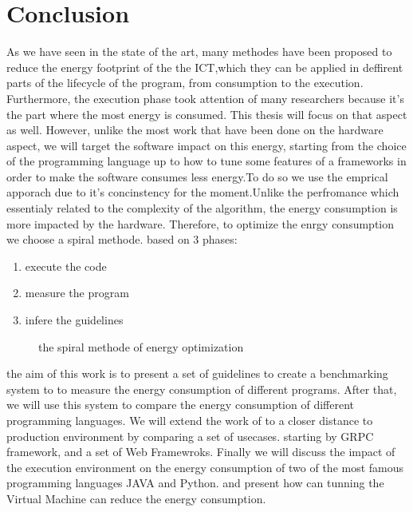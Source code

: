 \section{Conclusion}
As we have seen in the state of the art, many methodes have been proposed to reduce the energy footprint of the the ICT,which they can be applied in deffirent parts of the lifecycle of the program, from consumption to the execution. Furthermore, the execution phase took attention of many researchers because it's the part where the most energy is consumed. This thesis will focus on that aspect as well. However, unlike the most work that have been done on the hardware aspect, we will target the software impact on this energy, starting from the choice of the programming language up to how to tune some features of a frameworks in order to make the software consumes less energy.To do so we use the emprical apporach due to it's concinstency for the moment.Unlike the perfromance which essentialy related to the complexity of the algorithm, the energy consumption is more impacted by the hardware.
Therefore, to optimize the enrgy consumption we choose a spiral methode. based on 3 phases:
\begin{enumerate}
    \item execute the code
    \item measure the program
    \item infere the guidelines
\end{enumerate}


\begin{figure}[!hbt]
    \caption{the spiral methode of energy optimization }\label{fig:spirals}
\end{figure}
the aim of this work is to present a set of guidelines to create a benchmarking system to to measure the energy consumption of different programs.
After that, we will use this system to compare the energy consumption of different programming languages. We will extend the work of \citeauthor{pereira2017energy} to a closer distance to production environment by comparing a set of usecases. starting by GRPC framework, and a set of Web Framewroks. Finally we will discuss the impact of the execution environment on the energy consumption of two of the most famous programming languages JAVA and Python. and present how can tunning the Virtual Machine can reduce the energy consumption.

